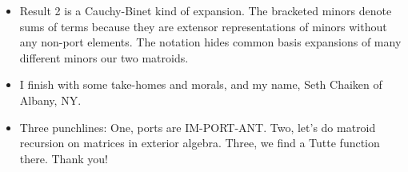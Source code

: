 \documentclass[14pt]{extarticle}
\begin{document}
{\begin{itemize}
\item
  Result 2 is a Cauchy-Binet kind of expansion. The bracketed minors denote sums of terms
  because they are extensor representations of minors without any non-port elements.
  The notation hides common basis expansions of many different minors our two matroids.


\item
  I finish with some take-homes and morals, and my name, Seth Chaiken
  of Albany, NY.

  \item
  Three punchlines:  One, ports are IM-PORT-ANT.
  Two, let's do matroid recursion on matrices in exterior algebra.
  Three, we find a Tutte function there.
  Thank you!
  \end{itemize}
}
\end{document}
